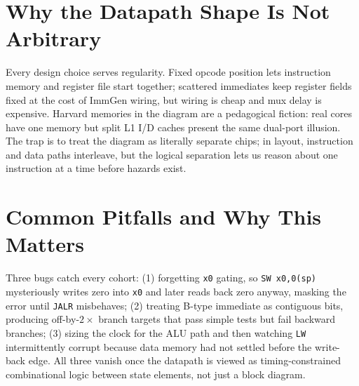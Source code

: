 \section{Why the Datapath Shape Is Not Arbitrary}
Every design choice serves regularity. Fixed opcode position lets instruction memory and register file start together; scattered immediates keep register fields fixed at the cost of ImmGen wiring, but wiring is cheap and mux delay is expensive. Harvard memories in the diagram are a pedagogical fiction: real cores have one memory but split L1 I/D caches present the same dual-port illusion. The trap is to treat the diagram as literally separate chips; in layout, instruction and data paths interleave, but the logical separation lets us reason about one instruction at a time before hazards exist.

\section{Common Pitfalls and Why This Matters}
Three bugs catch every cohort: (1) forgetting \texttt{x0} gating, so \texttt{SW x0,0(sp)} mysteriously writes zero into \texttt{x0} and later reads back zero anyway, masking the error until \texttt{JALR} misbehaves; (2) treating B-type immediate as contiguous bits, producing off-by-$2\times$ branch targets that pass simple tests but fail backward branches; (3) sizing the clock for the ALU path and then watching \texttt{LW} intermittently corrupt because data memory had not settled before the write-back edge. All three vanish once the datapath is viewed as timing-constrained combinational logic between state elements, not just a block diagram.


